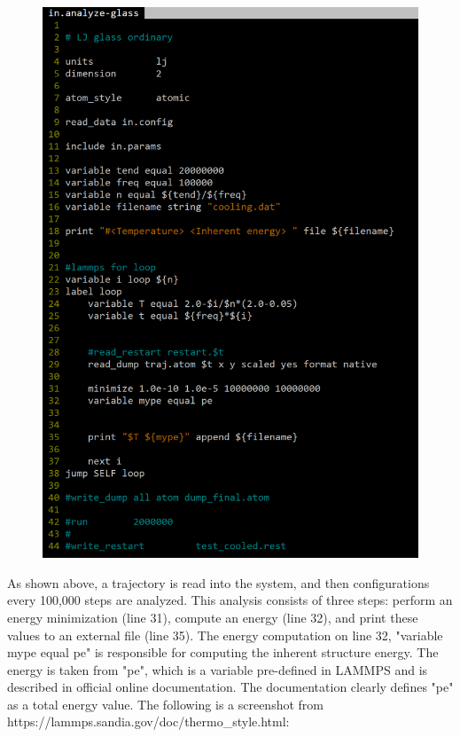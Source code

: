\documentclass[12pt,reqno]{amsart}
\numberwithin{equation}{section}
\begin{document}
\begin{enumerate}
\begin{figure}[H]
\centering
\includegraphics[scale=0.7]{energies}
\end{figure}

As shown above, a trajectory is read into the system, and then configurations every 100,000 steps are analyzed.  This analysis consists of three steps: perform an energy minimization (line 31), compute an energy (line 32), and print these values to an external file (line 35).  The energy computation on line 32, "variable mype equal pe" is responsible for computing the inherent structure energy.  The energy is taken from "pe", which is a variable pre-defined in LAMMPS and is described in official online documentation.  The documentation clearly defines "pe" as a total energy value.  The following is a screenshot from https://lammps.sandia.gov/doc/thermo\_style.html:


\end{enumerate}
\end{document}
